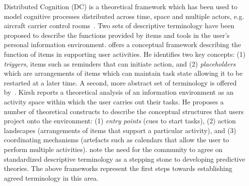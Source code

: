 Distributed Cognition (DC) is a theoretical framework which has been used to model cognitive processes distributed across time, space and multiple actors, e.g. aircraft carrier control rooms~\citep{dc:00}.
Two sets of descriptive terminology have been proposed to describe the functions provided by items and tools in the user's personal information environment.  \citet{dix:98} offers a conceptual framework describing the function of items in supporting user activities.  He identifies two key concepts: (1) \textit{triggers}, items such as reminders that can initiate action, and (2) \textit{placeholders} which are arrangements of items which can maintain task state allowing it to be restarted at a later time.  A second, more abstract set of terminology is offered by~\citet{dk:01}.  Kirsh reports a theoretical analysis of an information environment as an activity space within which the user carries out their tasks.  He proposes a number of theoretical constructs to describe the conceptual structures that users project onto the environment: (1) \textit{entry points} (cues to start tasks), (2) action landscapes (arrangements of items that support a particular activity), and (3) coordinating mechanisms (artefacts such as calendars that allow the user to perform multiple activities).  \citet{Whittaker-rta:00} note the need for the community to agree on standardized descriptive terminology as a stepping stone to developing predictive theories.  The above frameworks represent the first steps towards establishing agreed terminology in this area.  %


